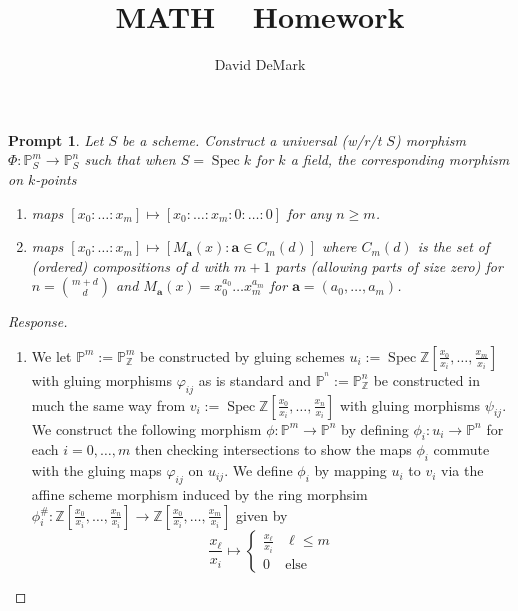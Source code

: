 \documentclass[english,letter,doublesided]{article}
\title{MATH \course~ Homework \Roman{hwn}}
\author{David DeMark}
\date{\due}
\renewcommand\vec{\mathbf}
\DeclareMathOperator{\spec}{Spec}
\newcommand{\ZZ}{\mathbb{Z}}
\newcommand{\PP}{\mathbb{P}}
\newcommand{\prob}[1]{\setcounter{section}{#1-1}\section{}}
\newcommand{\prt}[1]{\setcounter{subsection}{#1-1}\subsection{}}
\newtheorem*{prompt*}{Prompt}
\theoremstyle{remark}
\theoremstyle{definition}
\newcommand{\gph}{\varphi}
\newcommand{\fv}[2]{\frac{x_{#1}}{x_{#2}}}
\begin{document}
\maketitle
\prob{1}
\prt{1}

\prob{3}
\begin{prompt*}
Let $S$ be a scheme. Construct a universal (w/r/t $S$) morphism $\Phi:\PP^m_S\to \PP^n_S$ such that when $S=\spec k$ for $k$ a field, the corresponding morphism on $k$-points
\begin{enumerate}[label=\textit{(\roman*)}]
	\item maps $[x_0:\hdots:x_m]\mapsto [x_0:\hdots:x_m:0:\hdots:0]$ for any $n\geq m$. 
	\item maps $[x_0:\hdots:x_m]\mapsto [M_{\vec{a}}(x):\vec{a}\in C_m(d)]$ where $C_m(d)$ is the set of (ordered) compositions of $d$ with $m+1$ parts (allowing parts of size zero) for $n={m+d\choose d}$ and $M_{\vec{a}}(x)=x_0^{a_0}\hdots x_m^{a_m}$ for $\vec{a}=(a_0,\hdots,a_m)$.
\end{enumerate}
\end{prompt*}\begin{proof}[Response]
\begin{enumerate}[label=\textit{(\roman*)}]
	\item We let $\PP^m:=\PP^m_\ZZ$ be constructed by gluing schemes $u_i:= 
	\spec\ZZ[\fv{0}{i},\hdots,\fv{m}{i}]$ with gluing morphisms $\gph_{ij}$ as is standard and $\PP^^n:=\PP^n_\ZZ$ be constructed in much the same way from $v_i:= \spec\ZZ[\fv{0}{i},\hdots,\fv{n}{i}]$ with gluing morphisms $\psi_{ij}$. We construct the following morphism $\phi: \PP^m\to \PP^n$ by defining $\phi_i:u_i\to \PP^n$ for each $i=0,\hdots,m$ then checking intersections to show the maps $\phi_i$ commute with the gluing maps $\varphi_{ij}$ on $u_{ij}$. We define $\phi_i$ by mapping $u_i$ to $v_i$ via the affine scheme morphism induced by the ring morphsim $\phi_i^\#:\ZZ[\fv{0}{i},\hdots,\fv{n}{i}] \to \ZZ[\fv{0}{i},\hdots,\fv{m}{i}]$ given by \begin{equation*}\fv{\ell}{i}\mapsto\begin{cases}\fv{\ell}{i}&\ell\leq m\\0&\text{else}\end{cases}\end{equation*}

\end{enumerate}
\end{proof}
\end{document}
